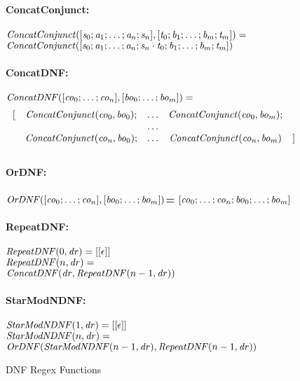 \begin{figure}
\bf{ConcatConjunct}:\\
\ConcatConjunct \OfType {}\\
$\mathit{ConcatConjunct}([\mathit{s}_0;\mathit{a}_1;\ldots;\mathit{a}_n;\mathit{s}_n],[\mathit{t}_0;\mathit{b}_1;\ldots;\mathit{b}_m;\mathit{t}_m])=$\\
\hspace*{2ex}$\mathit{ConcatConjunct}([\mathit{s}_0;\mathit{a}_1;\ldots;\mathit{a}_n;\mathit{s}_n\cdot\mathit{t}_0;\mathit{b}_1;\ldots;\mathit{b}_m;\mathit{t}_m])$\\
\\
\bf{ConcatDNF}:\\
\ConcatDNF \OfType {}\\
$\mathit{ConcatDNF}([\mathit{co}_0;\ldots;\mathit{co}_n],[\mathit{bo}_0;\ldots;\mathit{bo}_m])=$
\[
\begin{array}{rcccl}
[ & \mathit{ConcatConjunct}(\mathit{co}_0,\mathit{bo}_0); & \ldots & \mathit{ConcatConjunct}(\mathit{co}_0,\mathit{bo}_m); \\
& & \ldots & \\
& \mathit{ConcatConjunct}(\mathit{co}_n,\mathit{bo}_0); & \ldots & \mathit{ConcatConjunct}(\mathit{co}_n,\mathit{bo}_m) & ]
\end{array}
\]
\\
\bf{OrDNF}:\\
\OrDNF \OfType {}\\
$\mathit{OrDNF}([\mathit{co}_0;\ldots;\mathit{co}_n],[\mathit{bo}_0;\ldots;\mathit{bo}_m])$=
\hspace*{2ex}$[\mathit{co}_0;\ldots;\mathit{co}_n;\mathit{bo}_0;\ldots;\mathit{bo}_m]$\\
\\
\bf{RepeatDNF}:\\
\RepeatDNF \OfType {}\\
$\mathit{RepeatDNF}(0,\mathit{dr})=[[\epsilon]]$\\
$\mathit{RepeatDNF}(n,\mathit{dr})=$\\
\hspace*{2ex}$\mathit{ConcatDNF}(\mathit{dr},\mathit{RepeatDNF}(n-1,\mathit{dr}))$\\
\\
\bf{StarModNDNF}:\\
\StarModNDNF \OfType {}\\
$\mathit{StarModNDNF}(1,\mathit{dr})=[[\epsilon]]$\\
$\mathit{StarModNDNF}(n,\mathit{dr})=$\\
\hspace*{2ex}$\mathit{OrDNF}(\mathit{StarModNDNF}(n-1,\mathit{dr}),\mathit{RepeatDNF}(n-1,\mathit{dr}))$

\caption{DNF Regex Functions}
\label{fig:dnf-regex-functions}
\end{figure}
